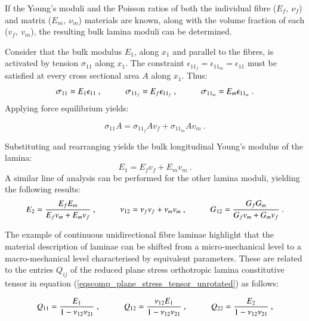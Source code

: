 If the Young's moduli and the Poisson ratios of both the individual fibre ($E_f,\ \nu_f$) and matrix ($E_m,\ \nu_m$) materials are known, along with the volume fraction of each ($v_f,\ v_m$), the resulting bulk lamina moduli can be determined. 

Consider that the bulk modulus $E_1$, along $x_1$ and parallel to the fibres, is activated by tension $\sigma_{11}$ along $x_1$. The constraint $\epsilon_{11_f} = \epsilon_{11_m} = \epsilon_{11}$ must be satisfied at every cross sectional area $A$ along $x_1$. Thus:
\begin{equation} 
\sigma_{11} = E_1\epsilon_{11}\ ,
\hspace{10mm}
\sigma_{11_f} = E_f\epsilon_{11_f}\ ,
\hspace{10mm}
\sigma_{11_m} = E_m\epsilon_{11_m}
\label{eqscomp5}\ .
\end{equation}
Applying force equilibrium yields:

\begin{equation} 
\sigma_{11}A = \sigma_{11_f}A v_f + \sigma_{11_m}A v_m
\label{eqscomp6}\ .
\end{equation}

Substituting and rearranging yields the bulk longitudinal Young's modulus of the lamina:
\begin{equation} 
E_1 = E_f v_f + E_m v_m
\label{eqscomp7}\ .
\end{equation}
A similar line of analysis can be performed for the other lamina moduli, yielding the following results:
\begin{equation} 
E_2 = \frac{E_f E_m}{E_f v_m + E_m v_f}\ ,
\hspace{10mm}
\nu_{12} = \nu_f v_f + \nu_m v_m\ ,
\hspace{10mm}
G_{12} = \frac{G_f G_m}{G_f v_m + G_m v_f}
\label{eqscomp8}\ .
\end{equation}

The example of continuous unidirectional fibre laminae highlight that the material description of laminae can be shifted from a micro-mechanical level to a macro-mechanical level characterised by equivalent parameters. These are related to the entries $Q_{ij}$ of the reduced plane stress orthotropic lamina constitutive tensor in equation (\ref{eqscomp_plane_stress_tensor_unrotated}) as follows:

\begin{equation} 
Q_{11} = \frac{E_1}{1-\nu_{12} \nu_{21}}\ ,
\hspace{10mm}
Q_{12} = \frac{\nu_{12} E_1}{1-\nu_{12} \nu_{21}}\ ,
\hspace{10mm}
Q_{22} = \frac{E_2}{1-\nu_{12} \nu_{21}}
\label{eqscomp9}\ ,
\end{equation}

